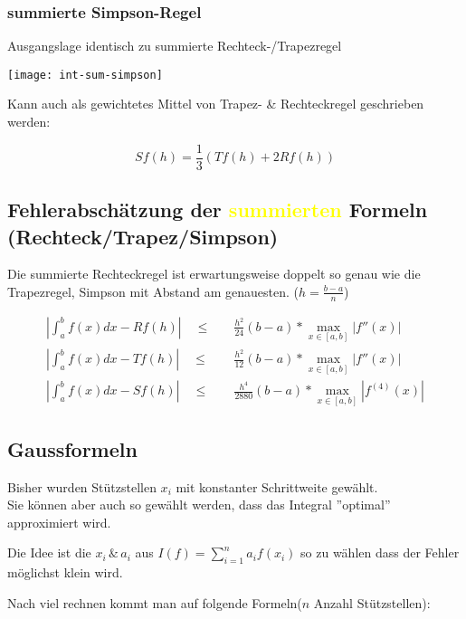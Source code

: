 \subsubsection{summierte Simpson-Regel}

Ausgangslage identisch zu summierte Rechteck-/Trapezregel

\begin{center}
	\texttt{[image: int-sum-simpson]}
\end{center}


Kann auch als gewichtetes Mittel von Trapez- \& Rechteckregel geschrieben werden:

$$Sf(h) = \frac{1}{3}(Tf(h) + 2Rf(h))$$




\subsection{Fehlerabschätzung der \textcolor{yellow}{summierten} Formeln
	(Rechteck/Trapez/Simpson)}

Die summierte Rechteckregel ist erwartungsweise doppelt so genau wie die Trapezregel,
Simpson mit Abstand am genauesten. ($h = \frac{b-a}{n}$)

{\large
		\begin{align*}
			|\int_a^b{f(x) dx} - Rf(h)| \quad \le & \quad \frac{h^2}{24} (b-a) * \max_{x \in [a, b]} |f''(x)|       \\
			|\int_a^b{f(x) dx} - Tf(h)| \quad \le & \quad \frac{h^2}{12} (b-a) * \max_{x \in [a, b]} |f''(x)|       \\
			|\int_a^b{f(x) dx} - Sf(h)| \quad \le & \quad \frac{h^4}{2880} (b-a) * \max_{x \in [a, b]} |f^{(4)}(x)|
		\end{align*}
	}




\subsection{Gaussformeln}

Bisher wurden Stützstellen $x_i$ mit konstanter Schrittweite gewählt.\\
Sie können aber auch so gewählt werden, dass das Integral ''optimal'' approximiert wird.

Die Idee ist die $x_i \, \& \, a_i$ aus $I(f) = \sum_{i=1}^n a_i f(x_i)$ so zu wählen
dass der Fehler möglichst klein wird.

Nach viel rechnen kommt man auf folgende Formeln($n$ Anzahl Stützstellen):

